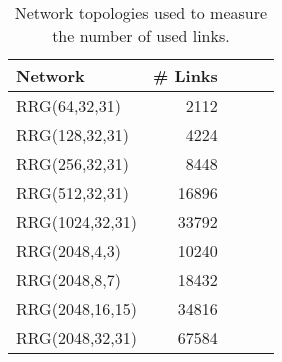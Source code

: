 \begin{table}[h]
\centering
\caption{Network topologies used to measure the number of used links.}
\label{table:network_parameters}
\begin{tabular}{|l|r|l|l|l|}
\hline
Network         & \# Links &  &  &  \\ \hline \hline
RRG(64,32,31)   & 2112                &  &  &  \\
RRG(128,32,31)  & 4224                &  &  &  \\
RRG(256,32,31)  & 8448                &  &  &  \\
RRG(512,32,31)  & 16896                &  &  &  \\
RRG(1024,32,31) & 33792                &  &  &  \\ \hline \hline
RRG(2048,4,3)   & 10240                &  &  &  \\
RRG(2048,8,7)   & 18432                &  &  &  \\
RRG(2048,16,15) & 34816                &  &  &  \\
RRG(2048,32,31) & 67584                &  &  &  \\ \hline
\end{tabular}
\end{table}
